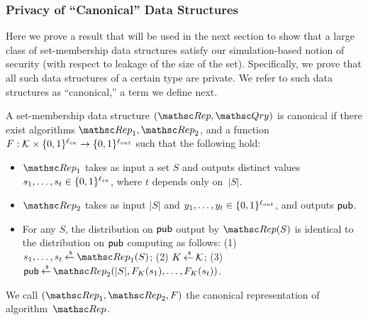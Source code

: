 \begin{theorem}
\subsubsection{Privacy of ``Canonical'' Data Structures }
Here we prove a result that will be used in the next section
to show that a large class of
set-membership
data structures satisfy our simulation-based notion of security
(with respect to leakage of the size of the set). Specifically, we prove that
all such data structures of a certain type are private. We refer to such data structures
as ``canonical,'' a term we define next.




\begin{definition}
A set-membership data structure $(\Rep, \Qry)$ is {\sf canonical} if
there exist algorithms $\Rep_1, \Rep_2$, and a function
$F: {\cal K} \times \{0,1\}^{\ell_{in}} \rightarrow \{0,1\}^{\ell_{out}}$
such that the following hold:
\begin{itemize}
\item $\Rep_1$ takes as input a set $S$ and outputs distinct values $s_1, \ldots, s_t \in \{0,1\}^{\ell_{in}}$,
where $t$ depends only on~$|S|$.
\item $\Rep_2$ takes as input $|S|$ and $y_1, \ldots, y_t \in \{0,1\}^{\ell_{out}}$, and outputs
${\sf pub}$.
\item For any $S$, the distribution on ${\sf pub}$ output by $\Rep(S)$ is identical to the distribution
on ${\sf pub}$ computing as follows:
(1) $s_1, \ldots, s_t \getsr \Rep_1(S)$;
(2) $K {\:\stackrel{{\scriptscriptstyle \hspace{0.2em}\$}} {\leftarrow}\:} {\cal K}$;
(3) $\pubaux \getsr \Rep_2(|S|, F_{K}(s_1), \ldots,F_{K}(s_t))$.
\end{itemize}
We call $(\Rep_1, \Rep_2, F)$ the {\sf canonical representation}
of algorithm~$\Rep$. \hfill\dqed
\end{definition}


\end{theorem}
